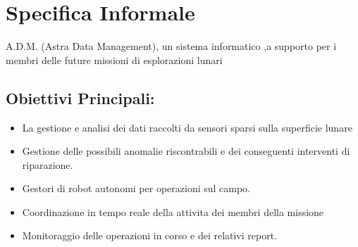 \section{Specifica Informale} 
A.D.M. (Astra Data Management), un sistema informatico ,a supporto per i membri delle future missioni di esplorazioni lunari

\subsection{Obiettivi Principali:}
\begin{itemize}
\item  La gestione e analisi dei dati raccolti da sensori sparsi sulla superficie lunare 
\item  Gestione delle possibili anomalie riscontrabili e dei conseguenti interventi di riparazione.
\item  Gestori di robot autonomi per operazioni sul campo.
\item  Coordinazione in tempo reale della attivita dei membri della missione
\item  Monitoraggio delle operazioni in corso e dei relativi report.
\end{itemize}

